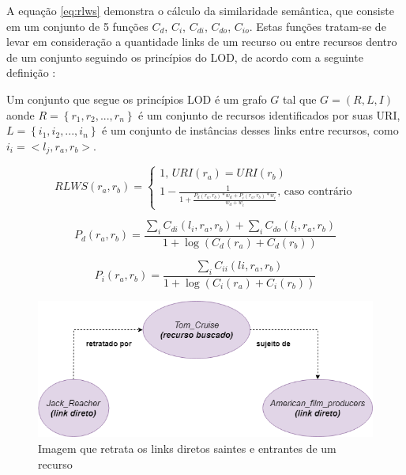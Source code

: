 A equação \ref{eq:rlws} demonstra o cálculo da similaridade semântica, que consiste em um conjunto de 5 funções  $C_d$, $C_i$, $C_{di}$, $C_{do}$, $C_{io}$. Estas funções tratam-se de levar em consideração a quantidade links de um recurso ou entre recursos dentro de um conjunto seguindo os princípios do \ac{LOD}, de acordo com a seguinte definição \citep{PiaoResim}:

\begin{definition}
Um conjunto que segue os princípios LOD é um grafo $G$ tal que $G = (R, L, I)$ aonde $R = \left\{r_1, r_2, ..., r_n\right\}$ é um conjunto de recursos identificados por suas URI, $L = \left\{i_1, i_2, ..., i_n\right\}$ é um conjunto de instâncias desses links entre recursos, como $i_i = <l_j, r_a, r_b>$.
\end{definition}

\begin{equation}
	RLWS(r_a, r_b) = 
	\begin{cases}
		1 \text{, } URI(r_a) = URI(r_b)\\
		1 - \frac{1}{1 + \frac{P_d(r_a, r_b) * w_d + P_i(r_a, r_b) * w_i}{w_d + w_i}} \text{, caso contrário}
	\end{cases}
\label{eq:rlws}
\end{equation}

\begin{equation}
	P_d(r_a, r_b) = \frac{\sum_i C_{di}(l_i, r_a, r_b) + \sum_i C_{do}(l_i, r_a, r_b)}{1 + \log (C_d(r_a) + C_d(r_b))}
\label{eq:rlws_ex1}
\end{equation}

\begin{equation}
	P_i(r_a, r_b) = \frac{\sum_i C_{ii}(li, r_a, r_b)}{1 + \log (C_i(r_a) + C_i(r_b))}
\label{eq:rlws_ex2}
\end{equation}

\begin{figure}
	\centering
	\includegraphics[scale=0.5]{imagens/cd_links.png}
	\caption{Imagem que retrata os links diretos saintes e entrantes de um recurso}
	\label{fig:cd_links}
\end{figure}

